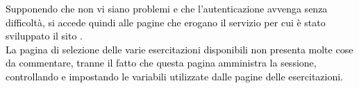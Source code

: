 \begin{minipage}{\textwidth}
	\textcolor{black}{Supponendo che non vi siano problemi e che l'autenticazione avvenga senza difficoltà, si accede quindi alle pagine che erogano il servizio per cui è stato sviluppato il sito .\\
	La pagina di selezione delle varie esercitazioni disponibili non presenta molte cose da commentare, tranne il fatto che questa pagina amministra la sessione, controllando e impostando le variabili utilizzate dalle pagine delle esercitazioni.}
\end{minipage}